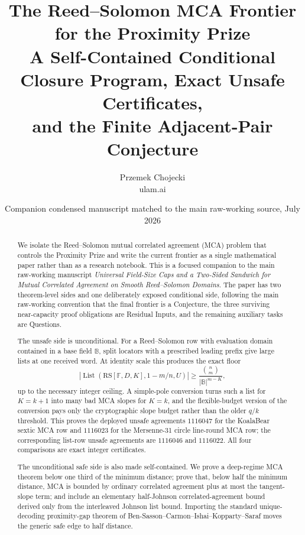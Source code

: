 \documentclass[11pt]{article}
\title{The Reed--Solomon MCA Frontier for the Proximity Prize\\[0.35em]
\textnormal{\normalsize A Self-Contained Conditional Closure Program, Exact Unsafe Certificates,\\
and the Finite Adjacent-Pair Conjecture}}
\author{Przemek Chojecki\\\small ulam.ai}
\date{Companion condensed manuscript matched to the main raw-working source, July 2026}
\theoremstyle{definition}
\theoremstyle{remark}
\newcommand{\F}{\mathbb F}
\newcommand{\BB}{\mathbb B}
\newcommand{\RS}{\mathrm{RS}}
\newcommand{\List}{\operatorname{List}}
\begin{document}
\maketitle

\begin{abstract}
We isolate the Reed--Solomon mutual correlated agreement (MCA) problem that controls the Proximity Prize and write the current frontier as a single mathematical paper rather than as a research notebook.  This is a focused companion to the main raw-working manuscript \emph{Universal Field-Size Caps and a Two-Sided Sandwich for Mutual Correlated Agreement on Smooth Reed--Solomon Domains}.  The paper has two theorem-level sides and one deliberately exposed conditional side, following the main raw-working convention that the final frontier is a Conjecture, the three surviving near-capacity proof obligations are Residual Inputs, and the remaining auxiliary tasks are Questions.

The unsafe side is unconditional.  For a Reed--Solomon row with evaluation domain contained in a base field \(\BB\), split locators with a prescribed leading prefix give large lists at one received word.  At identity scale this produces the exact floor
\[
        |\List(\RS[\F,D,K],1-m/n,U)|\ge \frac{\binom nm}{|\BB|^{m-K}},
\]
up to the necessary integer ceiling.  A simple-pole conversion turns such a list for \(K=k+1\) into many bad MCA slopes for \(K=k\), and the flexible-budget version of the conversion pays only the cryptographic slope budget rather than the older \(q/k\) threshold.  This proves the deployed unsafe agreements \(1116047\) for the KoalaBear sextic MCA row and \(1116023\) for the Mersenne-31 circle line-round MCA row; the corresponding list-row unsafe agreements are \(1116046\) and \(1116022\).  All four comparisons are exact integer certificates.

The unconditional safe side is also made self-contained.  We prove a deep-regime MCA theorem below one third of the minimum distance; prove that, below half the minimum distance, MCA is bounded by ordinary correlated agreement plus at most the tangent-slope term; and include an elementary half-Johnson correlated-agreement bound derived only from the interleaved Johnson list bound.  Importing the standard unique-decoding proximity-gap theorem of Ben-Sasson--Carmon--Ishai--Kopparty--Saraf moves the generic safe edge to half distance.


\end{abstract}
\end{document}
